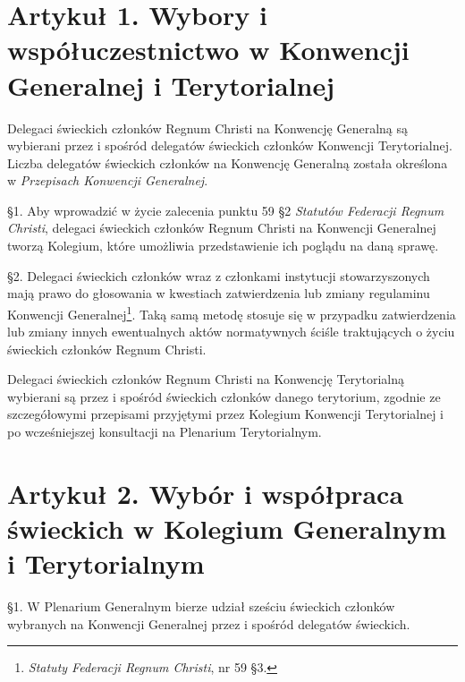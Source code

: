 \section{Artykuł 1. Wybory i współuczestnictwo w Konwencji Generalnej i Terytorialnej}


 Delegaci świeckich członków Regnum Christi na Konwencję Generalną są wybierani przez i spośród delegatów świeckich członków Konwencji Terytorialnej. Liczba delegatów świeckich członków na Konwencję Generalną została określona w {\em Przepisach Konwencji Generalnej}.


 \S{}1. Aby wprowadzić w życie zalecenia punktu 59 \S{}2 {\em Statutów Federacji Regnum Christi}, delegaci świeckich członków Regnum Christi na Konwencji Generalnej tworzą Kolegium, które umożliwia przedstawienie ich poglądu na daną sprawę.

\S{}2. Delegaci świeckich członków wraz z członkami instytucji stowarzyszonych mają prawo do głosowania w kwestiach zatwierdzenia lub zmiany regulaminu Konwencji Generalnej\footnote{{\em Statuty Federacji Regnum Christi}, nr 59 \S{}3.}. Taką samą metodę stosuje się w przypadku zatwierdzenia lub zmiany innych ewentualnych aktów normatywnych ściśle traktujących o życiu świeckich członków Regnum Christi.


 Delegaci świeckich członków Regnum Christi na Konwencję Terytorialną wybierani są przez i spośród świeckich członków danego terytorium, zgodnie ze szczegółowymi przepisami przyjętymi przez Kolegium Konwencji Terytorialnej i po wcześniejszej konsultacji na Plenarium Terytorialnym.


\section{Artykuł 2. Wybór i współpraca świeckich w Kolegium Generalnym i Terytorialnym}


 \S{}1. W Plenarium Generalnym bierze udział sześciu świeckich członków wybranych na Konwencji Generalnej przez i spośród delegatów świeckich.

